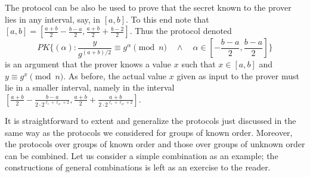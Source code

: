 The protocol can be also be used to prove that the secret known to the prover 
lies in any interval, say, in $[a,b]$.
To this end note that $[a,b] = [\frac{a+b}{2} -  \frac{b-a}{2} , \frac{a+b}{2} + \frac{b-2}{2} ]$.
Thus the protocol denoted 
\[\textit{PK}\{(\alpha): \frac{y}{g^{(a+b)/2}} \equiv g^\alpha \pmod{n} \quad \wedge \quad \alpha \in 
[-  \frac{b-a}{2} , \frac{b-a}{2} ] 
\}
\]
is an argument that the prover knows a value $x$ such 
that $x \in [a,b]$ and $y \equiv g^x \pmod{n}$.
As before, the actual value $x$ given as input to the prover 
must lie in a smaller interval, namely
in the interval 
$[\frac{a+b}{2} -  \frac{b-a}{2 \cdot 2^{\ell_c + \ell_\varnothing +2}} , 
\frac{a+b}{2} + \frac{a+b}{2 \cdot 2^{\ell_c + \ell_\varnothing +2}}]$.


It is straightforward to extent and generalize the protocols just discussed 
in the same way as the
protocols we considered for groups of 
known order.
Moreover, the protocols over groups of known order and those over groups of
unknown order can be combined.
Let us consider a simple combination as an example; 
the constructions of general combinations
is left as an exercise to the reader.

